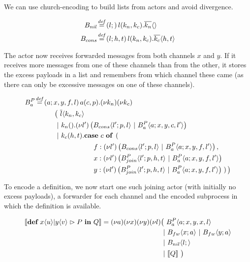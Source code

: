 We can use church-encoding to build lists from actors and avoid divergence.


\begin{align*}
  \adef*{B_{nil}}{l}{}{\arcv{l}{k_n,k_c} . \asnd{k_n}{}}
  \\
  \adef*{B_{cons}}{l}{h,t}{\arcv{l}{k_n,k_c} . \asnd{k_c}{h,t}}
\end{align*}

The actor now receives forwarded messages from both channels $x$ and $y$.
If it receives more messages from one of these channels than from the other,
it stores the excess payloads in a list and remembers from which channel
these came (as there can only be excessive messages on one of these channels).

\begin{align*}
  \adef*{B_a^P}{a}{x,y,f,l}{\arcv{a}{c,p} . \anew{k_n}{\anew{k_c}{
  \\ & \hspace{1cm}
    \big(\ \asnd{l}{k_n,k_c}
  \\ & \hspace{1cm}
    \apar \arcv{k_n}{} . \anew{l'}{\parens{\ains{B_{cons}}{l'}{p, l} \apar \ains{B_a^P}{a}{x, y, c, l'}}}
  \\ & \hspace{1cm}
    \apar \arcv{k_c}{h,t} . \acse{c}{\right.
  \\ & \hspace{3cm}
    \aalt{f}{\anew{l'}{\parens{\ains{B_{cons}}{l'}{p, l} \apar \ains{B_a^P}{a}{x, y, f, l'}}}},
  \\ & \hspace{3cm}
    \aalt{x}{\anew{l'}{\parens{\ains{B_{join}^P}{l'}{p, h, t} \apar \ains{B_a^P}{a}{x, y, f, l'}}}}
  \\ & \hspace{3cm}
    \aalt{y}{\anew{l'}{\parens{\ains{B_{join}^P}{l'}{p, h, t} \apar \ains{B_a^P}{a}{x, y, f, l'}}}}
    \left.}\big)
  }}} \\
\end{align*}

To encode a \joincalc definition,
we now start one such joining actor (with initially no excess payloads),
a forwarder for each channel
and the encoded subprocess in which the definition is available.

\begin{align*}
  \encMJtoAP{\jdef{\jrct{\jrcv{x}{u} \jpat \jrcv{y}{v}}{P}}{Q}}
  = \anew{a}{\anew{x}{\anew{y}{\anew{l}{
    &\big(\ \ains{B_a^P}{a}{x, y, x, l} \\
    &\apar \ains{B_{fw}}{x}{a} \apar \ains{B_{fw}}{y}{a} \\
    &\apar \ains{B_{nil}}{l}{} \\
    &\apar \encMJtoAP{Q}
  \ \big)}}}} \\
\end{align*}

